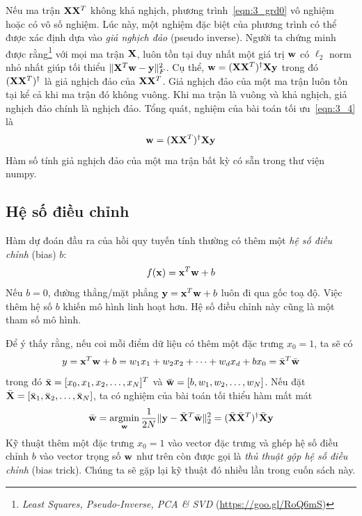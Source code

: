 {Nếu ma trận $\mathbf{X}\mathbf{X}^T$ không khả nghịch}, phương trình~\eqref{eqn:3_grd0} vô
nghiệm hoặc có vô số nghiệm. Lúc này, một nghiệm đặc biệt của phương trình có
thể được xác định dựa vào \textit{giả nghịch đảo} (pseudo inverse). Người ta chứng minh được
rằng\footnote{\textit{Least Squares, Pseudo-Inverse, PCA \& SVD}
(\url{https://goo.gl/RoQ6mS})} với mọi ma trận $\mathbf{X}$, luôn tồn tại duy nhất một
giá trị $\mathbf{w}$ có $\ell_2$ norm nhỏ nhất giúp tối thiểu $\|\mathbf{X}^T\mathbf{w} - \mathbf{y}\|_F^2$.
Cụ thể, $\mathbf{w} = (\mathbf{X}\mathbf{X}^T)^{\dagger}\mathbf{X}\mathbf{y}$ trong đó $(\mathbf{X}\mathbf{X}^T)^{\dagger}$ là
giả nghịch đảo của $\mathbf{X}\mathbf{X}^T$. Giả nghịch đảo của một ma trận luôn
tồn tại kể cả khi ma trận đó không vuông. Khi ma trận là vuông và khả
nghịch, giả nghịch đảo chính là nghịch đảo. Tổng quát, nghiệm của bài toán tối
ưu~\eqref{eqn:3_4} là
\begin{equation}
\mathbf{w} = (\mathbf{X}\mathbf{X}^T)^{\dagger}\mathbf{X}\mathbf{y}
\end{equation}
Hàm số tính giả nghịch đảo của một ma trận bất kỳ có sẵn trong thư viện numpy.

\subsection{Hệ số điều chỉnh}
\label{ssec:3_biastrick}
Hàm dự đoán đầu ra của hồi quy tuyến tính thường có thêm một \textit{hệ số điều chỉnh} (bias) $b$:
\begin{equation}
f(\mathbf{x}) = \mathbf{x}^T\mathbf{w} + b
\end{equation}
Nếu $b = 0$, đường thẳng/mặt phẳng $\mathbf{y} = \mathbf{x}^T\mathbf{w} + b$ luôn đi qua gốc toạ độ. Việc thêm
hệ số $b$ khiến mô hình linh hoạt hơn. Hệ số điều chỉnh này cũng là một tham số mô hình.


Để ý thấy rằng, nếu coi mỗi điểm dữ liệu có thêm một đặc trưng $x_0 = 1$, ta sẽ có
\begin{equation}
y = \mathbf{x}^T\mathbf{w} + b = w_1x_1 + w_2x_2 + \dots + w_dx_d + bx_0 =
\bar{\mathbf{x}}^T\bar{\mathbf{w}}
\end{equation}
trong đó $\bar{\mathbf{x}} = [x_0, x_1, x_2, \dots, x_N]^T$ và $\bar{\mathbf{w}} = [b, w_1,
w_2, \dots, w_N]$. Nếu đặt $\bar{\mathbf{X}} = [\bar{\mathbf{x}}_1, \bar{\mathbf{x}}_2, \dots, \bar{\mathbf{x}}_N]$, ta có nghiệm của bài toán tối thiểu hàm mất mát
\begin{equation}
\label{eqn:3_finalsolution}
\bar{\mathbf{w}} = \operatorname*{argmin}_{\mathbf{w}} \frac{1}{2N}\|\mathbf{y} - \bar{\mathbf{X}}^T\bar{\mathbf{w}}\|_2^2 = (\bar{\mathbf{X}}
\bar{\mathbf{X}}^T)^{\dagger} \bar{\mathbf{X}}\mathbf{y}
\end{equation}
Kỹ thuật thêm một đặc trưng $x_0 = 1$ vào vector đặc trưng và ghép hệ số điều chỉnh $b$ vào
vector trọng số $\mathbf{w}$ như trên còn được gọi là \textit{thủ thuật gộp hệ số điều chỉnh} (bias trick). Chúng ta sẽ
gặp lại kỹ thuật đó nhiều lần trong cuốn sách này.


